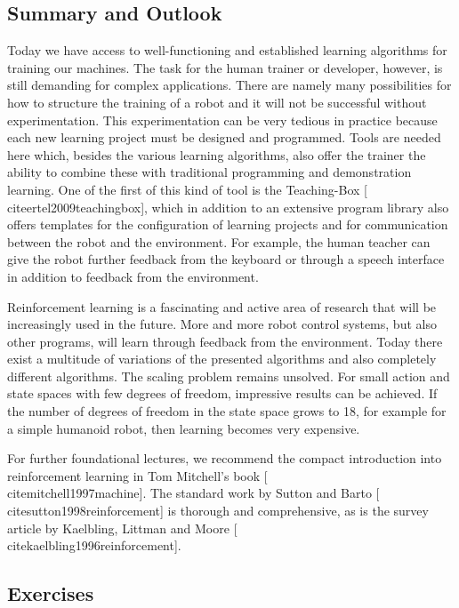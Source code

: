 \documentclass[10pt]{book}
\begin{document}
\subsection*{Summary and Outlook}
Today we have access to well-functioning and established learning algorithms for training our machines. The task for the human trainer or developer, however, is still demanding for complex applications. There are namely many possibilities for how to structure the training of a robot and it will not be successful without experimentation. This experimentation can be very tedious in practice because each new learning project must be designed and programmed. Tools are needed here which, besides the various learning algorithms, also offer the trainer the ability to combine these with traditional programming and demonstration learning. One of the first of this kind of tool is the Teaching-Box [\\cite{ertel2009teachingbox}], which in addition to an extensive program library also offers templates for the configuration of learning projects and for communication between the robot and the environment. For example, the human teacher can give the robot further feedback from the keyboard or through a speech interface in addition to feedback from the environment.


Reinforcement learning is a fascinating and active area of research that will be increasingly used in the future. More and more robot control systems, but also other programs, will learn through feedback from the environment. Today there exist a multitude of variations of the presented algorithms and also completely different algorithms. The scaling problem remains unsolved. For small action and state spaces with few degrees of freedom, impressive results can be achieved. If the number of degrees of freedom in the state space grows to 18, for example for a simple humanoid robot, then learning becomes very expensive.

For further foundational lectures, we recommend the compact introduction into reinforcement learning in Tom Mitchell's book [\\cite{mitchell1997machine}]. The standard work by Sutton and Barto [\\cite{sutton1998reinforcement}] is thorough and comprehensive, as is the survey article by Kaelbling, Littman and Moore [\\cite{kaelbling1996reinforcement}].

\subsection*{Exercises}
\end{document}
